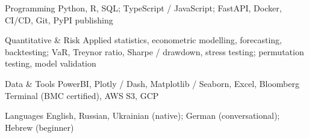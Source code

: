 

\begin{cvskills}

  \cvskill
    {Programming} %
    {Python, R, SQL; TypeScript / JavaScript; FastAPI, Docker, CI/CD, Git, PyPI publishing} %

  \cvskill
    {Quantitative \& Risk} %
    {Applied statistics, econometric modelling, forecasting, backtesting; VaR, Treynor ratio, Sharpe / drawdown, stress testing; permutation testing, model validation} %

  \cvskill
    {Data \& Tools} %
    {PowerBI, Plotly / Dash, Matplotlib / Seaborn, Excel, Bloomberg Terminal (BMC certified), AWS S3, GCP} %

  \cvskill
    {Languages} %
    {English, Russian, Ukrainian (native); German (conversational); Hebrew (beginner)} %

\end{cvskills}
